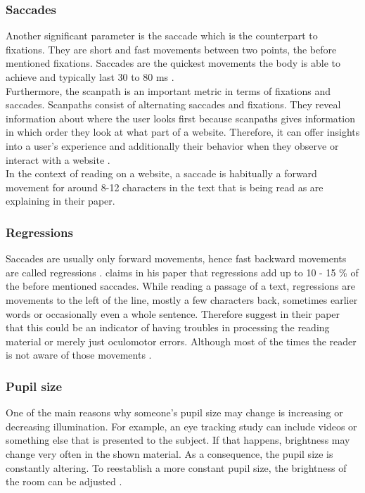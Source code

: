 \subsubsection{Saccades}
Another significant parameter is the saccade which is the counterpart to fixations. They are short and fast movements between two points, the before mentioned fixations. Saccades are the quickest movements the body is able to achieve and typically last 30 to 80 ms \autocite[]{blascheck2014state}. \\
Furthermore, the scanpath is an important metric in terms of fixations and saccades. Scanpaths consist of alternating saccades and fixations. They reveal information about where the user looks first because scanpaths gives information in which order they look at what part of a website. Therefore, it can offer insights into a user's experience and additionally their behavior when they observe or interact with a website \autocite[]{lorigo2008eye, blascheck2014state}.\\
In the context of reading on a website, a saccade is habitually a forward movement for around 8-12 characters in the text that is being read as \textcite[]{beymer2007eye} are explaining in their paper.

\subsubsection{Regressions}
Saccades are usually only forward movements, hence fast backward movements are called regressions \autocite[]{reichle1998toward}. 
\textcite[]{rayner1998eye} claims in his paper that regressions add up to 10 - 15 \% of the before mentioned saccades.
While reading a passage of a text, regressions are movements to the left of the line, mostly a few characters back, sometimes earlier words or occasionally even a whole sentence. Therefore \textcite[]{kruger2014subtitles} suggest in their paper that this could be an indicator of having troubles in processing the reading material or merely just oculomotor errors. Although most of the times the reader is not aware of those movements \autocite[]{reichle2003ez, biedert2010eyebook}.

\subsubsection{Pupil size}
One of the main reasons why someone's pupil size may change is increasing or decreasing illumination. For example, an eye tracking study can include videos or something else that is presented to the subject. If that happens, brightness may change very often in the shown material. As a consequence, the pupil size is constantly altering. To reestablish a more constant pupil size, the brightness of the room can be adjusted \autocite[]{goldberg2002eye}.

